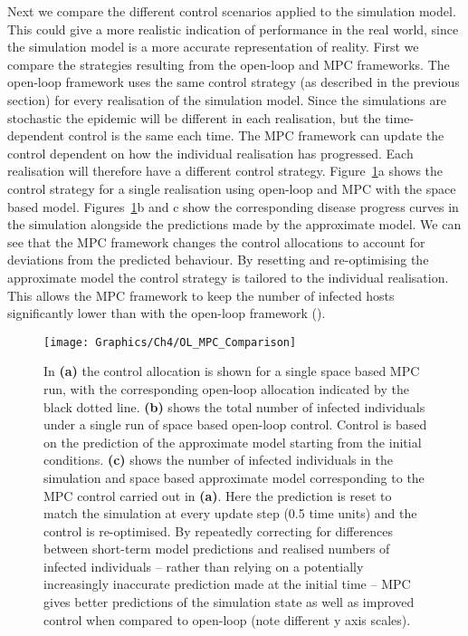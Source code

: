 Next we compare the different control scenarios applied to the simulation model. This could give a more realistic indication of performance in the real world, since the simulation model is a more accurate representation of reality. First we compare the strategies resulting from the open-loop and MPC frameworks. The open-loop framework uses the same control strategy (as described in the previous section) for every realisation of the simulation model. Since the simulations are stochastic the epidemic will be different in each realisation, but the time-dependent control is the same each time. The MPC framework can update the control dependent on how the individual realisation has progressed. Each realisation will therefore have a different control strategy. Figure~\ref{fig:ch4:ol_mpc_comparison}a shows the control strategy for a single realisation using open-loop and MPC with the space based model. Figures~\ref{fig:ch4:ol_mpc_comparison}b and c show the corresponding disease progress curves in the simulation alongside the predictions made by the approximate model. We can see that the MPC framework changes the control allocations to account for deviations from the predicted behaviour. By resetting and re-optimising the approximate model the control strategy is tailored to the individual realisation. This allows the MPC framework to keep the number of infected hosts significantly lower than with the open-loop framework ().

\begin{figure}[h]
    \begin{center}
        \texttt{[image: Graphics/Ch4/OL\_MPC\_Comparison]}
        \caption{In \textbf{(a)} the control allocation is shown for a single space based MPC run, with the corresponding open-loop allocation indicated by the black dotted line. \textbf{(b)} shows the total number of infected individuals under a single run of space based open-loop control. Control is based on the prediction of the approximate model starting from the initial conditions. \textbf{(c)} shows the number of infected individuals in the simulation and space based approximate model corresponding to the MPC control carried out in \textbf{(a)}. Here the prediction is reset to match the simulation at every update step (0.5 time units) and the control is re-optimised. By repeatedly correcting for differences between short-term model predictions and realised numbers of infected individuals -- rather than relying on a potentially increasingly inaccurate prediction made at the initial time -- MPC gives better predictions of the simulation state as well as improved control when compared to open-loop (note different y axis scales).}
        \label{fig:ch4:ol_mpc_comparison}
    \end{center}
\end{figure}

